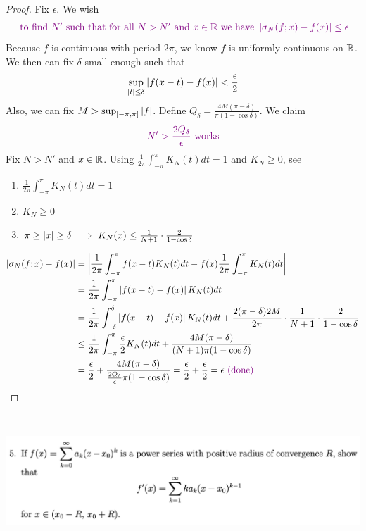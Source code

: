 \documentclass{report}
\begin{document}
\begin{proof}
Fix $\epsilon $. We wish 
\begin{align*}
\textcolor{violet}{\text{ to find $N'$ such that for all $N>N'$ and  $x \in\mathbb{R}$ we have }\left|\sigma_N(f;x)-f(x)\right|\leq \epsilon }
\end{align*}
Because $f$ is continuous with period $2\pi$, we know $f$ is uniformly continuous on $\mathbb{R}$. We then can fix $\delta$ small enough such that 
\begin{align*}
\sup_{\left|t\right|\leq \delta} \left|f(x-t)-f(x)\right|<\frac{\epsilon}{2}
\end{align*}
Also, we can fix $M>\sup_{[-\pi,\pi]}\left|f\right|$. Define $Q_\delta=\frac{4M(\pi-\delta)}{\pi (1-\cos \delta)}$. We claim 
\begin{align*}
\textcolor{violet}{\text{ $N'>\frac{2Q_\delta}{\epsilon }$ works }}
\end{align*}
Fix $N>N'$ and  $x \in\mathbb{R}$. Using $\frac{1}{2\pi}\int_{-\pi}^{\pi}K_N(t)dt=1$ and $K_N\geq 0$, see 
\begin{enumerate}[label=(\alph*)]
  \item $\frac{1}{2\pi}\int_{-\pi}^{\pi}K_N(t)dt=1$ 
  \item $K_N\geq 0$
  \item $\pi \geq \left|x\right|\geq \delta \implies K_N(x)\leq \frac{1}{N+1}\cdot \frac{2}{1-\cos \delta}$
\end{enumerate}
\begin{align*}
\left|\sigma_N(f;x)-f(x)\right|&=\left|\frac{1}{2\pi}\int_{-\pi}^{\pi}f(x-t)K_N(t)dt-f(x)\frac{1}{2\pi}\int_{-\pi}^{\pi}K_N(t)dt\right|\\
&=\frac{1}{2\pi}\int_{-\pi}^{\pi}\left|f(x-t)-f(x)\right|K_N(t)dt\\
&=\frac{1}{2\pi}\int_{-\delta}^{\delta} \left|f(x-t)-f(x)\right|K_N(t)dt+\frac{2(\pi -\delta)2M}{2\pi}\cdot \frac{1}{N+1}\cdot \frac{2}{1-\cos \delta}\\
&\leq \frac{1}{2\pi}\int_{-\pi}^{\pi}\frac{\epsilon }{2}K_N(t)dt+\frac{4M(\pi -\delta)}{(N+1)\pi(1-\cos \delta)}\\
&=\frac{\epsilon}{2}+\frac{4M(\pi-\delta)}{\frac{2Q_\delta}{\epsilon }\pi(1-\cos \delta)}=\frac{\epsilon}{2}+\frac{\epsilon}{2}=\epsilon\textcolor{violet}{\text{ (done) }}
\end{align*}
\end{proof}
\begin{question}{}{}
\includegraphics[height=5cm,width=18cm]{ahw26}
\end{question}
\end{document}
